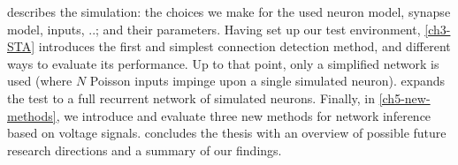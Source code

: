  describes the simulation: the choices we make for the used neuron model, synapse model, inputs, ..; and their parameters. Having set up our test environment, \cref{ch3-STA} introduces the first and simplest connection detection method, and different ways to evaluate its performance. Up to that point, only a simplified network is used (where $N$ Poisson inputs impinge upon a single simulated neuron).  expands the test to a full recurrent network of simulated neurons. Finally, in \cref{ch5-new-methods}, we introduce and evaluate three new methods for network inference based on voltage signals.  concludes the thesis with an overview of possible future research directions and a summary of our findings.

